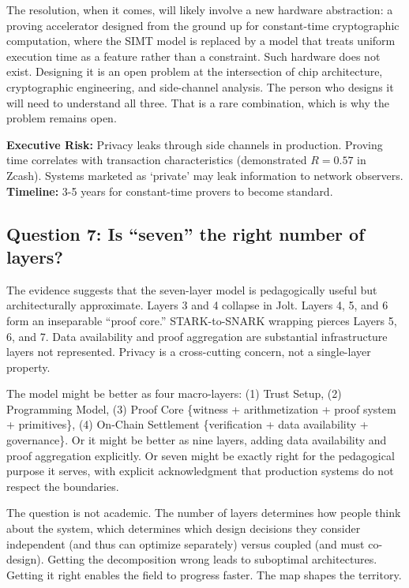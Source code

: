 \documentclass[
  11pt,
  openany]{report}
\renewcommand{\textbf}[1]{{\bfseries\color{MidnightBold}#1}}
\begin{document}
The resolution, when it comes, will likely involve a new hardware abstraction: a
proving accelerator designed from the ground up for constant-time cryptographic
computation, where the SIMT model is replaced by a model that treats uniform
execution time as a feature rather than a constraint. Such hardware does not
exist. Designing it is an open problem at the intersection of chip architecture,
cryptographic engineering, and side-channel analysis. The person who designs it
will need to understand all three. That is a rare combination, which is why the
problem remains open.

\textbf{Executive Risk:} Privacy leaks through side channels in production.
Proving time correlates with transaction characteristics (demonstrated
\(R = 0.57\) in Zcash). Systems marketed as `private' may leak information to
network observers. \textbf{Timeline:} 3-5 years for constant-time provers to
become standard.

\subsection{Question 7: Is ``seven'' the right number of
layers?}\label{question-7-is-seven-the-right-number-of-layers}

The evidence suggests that the seven-layer model is pedagogically useful but
architecturally approximate. Layers 3 and 4 collapse in Jolt. Layers 4, 5, and 6
form an inseparable ``proof core.'' STARK-to-SNARK wrapping pierces Layers 5, 6,
and 7. Data availability and proof aggregation are substantial infrastructure
layers not represented. Privacy is a cross-cutting concern, not a single-layer
property.

The model might be better as four macro-layers: (1) Trust Setup, (2) Programming
Model, (3) Proof Core \{witness + arithmetization + proof system + primitives\},
(4) On-Chain Settlement \{verification + data availability + governance\}. Or it
might be better as nine layers, adding data availability and proof aggregation
explicitly. Or seven might be exactly right for the pedagogical purpose it
serves, with explicit acknowledgment that production systems do not respect the
boundaries.

The question is not academic. The number of layers determines how people think
about the system, which determines which design decisions they consider
independent (and thus can optimize separately) versus coupled (and must
co-design). Getting the decomposition wrong leads to suboptimal architectures.
Getting it right enables the field to progress faster. The map shapes the
territory.
\end{document}
